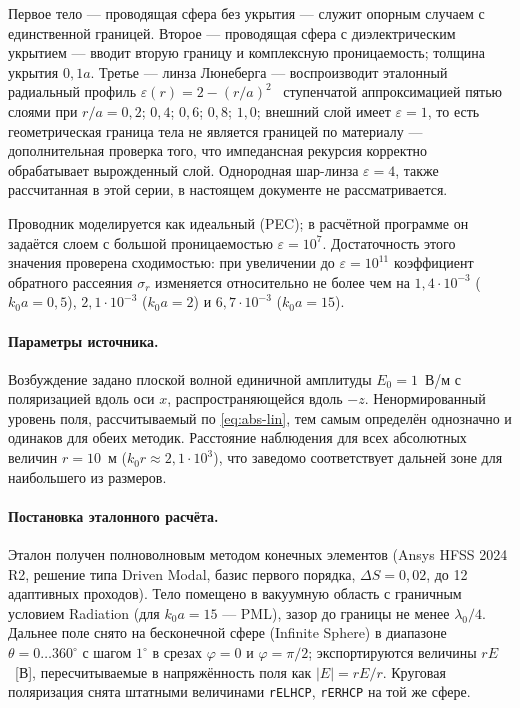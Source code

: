 \documentclass[11pt,a4paper]{article}
\begin{document}
Первое тело --- проводящая сфера без укрытия --- служит опорным случаем с
единственной границей. Второе --- проводящая сфера с диэлектрическим укрытием ---
вводит вторую границу и комплексную проницаемость; толщина укрытия $0{,}1a$.
Третье --- линза Люнеберга --- воспроизводит эталонный радиальный профиль
$\varepsilon(r) = 2 - (r/a)^2$~\cite{luneburg1944} ступенчатой аппроксимацией пятью
слоями при $r/a = 0{,}2$; $0{,}4$; $0{,}6$; $0{,}8$; $1{,}0$; внешний слой имеет
$\varepsilon = 1$, то есть геометрическая граница тела не является границей по
материалу --- дополнительная проверка того, что импедансная рекурсия корректно
обрабатывает вырожденный слой. Однородная шар-линза $\varepsilon = 4$, также
рассчитанная в этой серии, в настоящем документе не рассматривается.

Проводник моделируется как идеальный (PEC); в расчётной программе он задаётся слоем
с большой проницаемостью $\varepsilon = 10^{7}$. Достаточность этого значения
проверена сходимостью: при увеличении до $\varepsilon = 10^{11}$ коэффициент
обратного рассеяния $\sigma_r$ изменяется относительно не более чем на
$1{,}4\cdot10^{-3}$ ($k_0a = 0{,}5$), $2{,}1\cdot10^{-3}$ ($k_0a = 2$) и
$6{,}7\cdot10^{-3}$ ($k_0a = 15$).

\paragraph{Параметры источника.}
Возбуждение задано плоской волной единичной амплитуды $E_0 = 1$~В/м с поляризацией
вдоль оси $x$, распространяющейся вдоль $-z$. Ненормированный уровень поля,
рассчитываемый по \eqref{eq:abs-lin}, тем самым определён однозначно и одинаков для
обеих методик. Расстояние наблюдения для всех абсолютных величин
$r = 10$~м ($k_0r \approx 2{,}1\cdot10^{3}$), что заведомо соответствует дальней
зоне для наибольшего из размеров.

\paragraph{Постановка эталонного расчёта.}
Эталон получен полноволновым методом конечных элементов (Ansys HFSS 2024\,R2,
решение типа Driven Modal, базис первого порядка, $\Delta S = 0{,}02$, до 12
адаптивных проходов). Тело помещено в вакуумную область с граничным условием
Radiation (для $k_0a = 15$ --- PML), зазор до границы не менее $\lambda_0/4$.
Дальнее поле снято на бесконечной сфере (Infinite Sphere) в диапазоне
$\theta = 0\ldots360^\circ$ с шагом $1^\circ$ в срезах $\varphi = 0$ и
$\varphi = \pi/2$; экспортируются величины $rE$~[В], пересчитываемые в напряжённость
поля как $|E| = rE/r$. Круговая поляризация снята штатными величинами
\texttt{rELHCP}, \texttt{rERHCP} на той же сфере.
\end{document}
